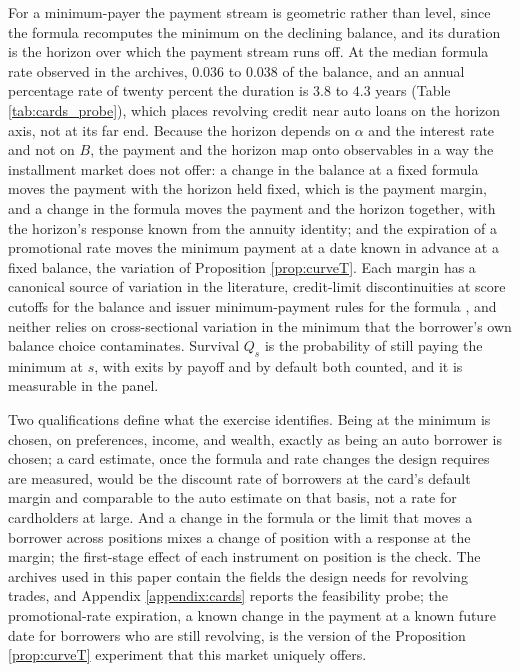 For a minimum-payer the payment stream is geometric rather than level, since the formula recomputes the minimum on the declining balance, and its duration is the horizon over which the payment stream runs off. At the median formula rate observed in the archives, $0.036$ to $0.038$ of the balance, and an annual percentage rate of twenty percent the duration is $3.8$ to $4.3$ years (Table \ref{tab:cards_probe}), which places revolving credit near auto loans on the horizon axis, not at its far end. Because the horizon depends on $\alpha$ and the interest rate and not on $B$, the payment and the horizon map onto observables in a way the installment market does not offer: a change in the balance at a fixed formula moves the payment with the horizon held fixed, which is the payment margin, and a change in the formula moves the payment and the horizon together, with the horizon's response known from the annuity identity; and the expiration of a promotional rate moves the minimum payment at a date known in advance at a fixed balance, the variation of Proposition \ref{prop:curveT}. Each margin has a canonical source of variation in the literature, credit-limit discontinuities at score cutoffs for the balance \citep{agarwal_credit_2018, gross_liquidity_2002} and issuer minimum-payment rules for the formula \citep{keys_minimum_2019}, and neither relies on cross-sectional variation in the minimum that the borrower's own balance choice contaminates. Survival $Q_s$ is the probability of still paying the minimum at $s$, with exits by payoff and by default both counted, and it is measurable in the panel.

Two qualifications define what the exercise identifies. Being at the minimum is chosen, on preferences, income, and wealth, exactly as being an auto borrower is chosen; a card estimate, once the formula and rate changes the design requires are measured, would be the discount rate of borrowers at the card's default margin and comparable to the auto estimate on that basis, not a rate for cardholders at large. And a change in the formula or the limit that moves a borrower across positions mixes a change of position with a response at the margin; the first-stage effect of each instrument on position is the check. The archives used in this paper contain the fields the design needs for revolving trades, and Appendix \ref{appendix:cards} reports the feasibility probe; the promotional-rate expiration, a known change in the payment at a known future date for borrowers who are still revolving, is the version of the Proposition \ref{prop:curveT} experiment that this market uniquely offers.

